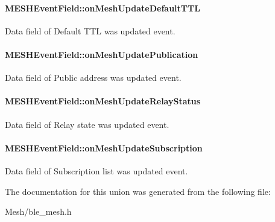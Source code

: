 \paragraph[{\texorpdfstring{on\+Mesh\+Update\+Default\+T\+TL}{onMeshUpdateDefaultTTL}}]{ M\+E\+S\+H\+Event\+Field\+::on\+Mesh\+Update\+Default\+T\+TL}\hypertarget{union_m_e_s_h_event_field_a0e704c9170129c99606ee62a60fb75d1}{}\label{union_m_e_s_h_event_field_a0e704c9170129c99606ee62a60fb75d1}
Data field of Default T\+TL was updated event. 
\paragraph[{\texorpdfstring{on\+Mesh\+Update\+Publication}{onMeshUpdatePublication}}]{ M\+E\+S\+H\+Event\+Field\+::on\+Mesh\+Update\+Publication}\hypertarget{union_m_e_s_h_event_field_a0c313b0969b5296112f23a352b7f1145}{}\label{union_m_e_s_h_event_field_a0c313b0969b5296112f23a352b7f1145}
Data field of Public address was updated event. 
\paragraph[{\texorpdfstring{on\+Mesh\+Update\+Relay\+Status}{onMeshUpdateRelayStatus}}]{ M\+E\+S\+H\+Event\+Field\+::on\+Mesh\+Update\+Relay\+Status}\hypertarget{union_m_e_s_h_event_field_af68544f8b6e88e0faba7cae025c7df4e}{}\label{union_m_e_s_h_event_field_af68544f8b6e88e0faba7cae025c7df4e}
Data field of Relay state was updated event. 
\paragraph[{\texorpdfstring{on\+Mesh\+Update\+Subscription}{onMeshUpdateSubscription}}]{ M\+E\+S\+H\+Event\+Field\+::on\+Mesh\+Update\+Subscription}\hypertarget{union_m_e_s_h_event_field_a383d8787001995c25a19f960d9928ce6}{}\label{union_m_e_s_h_event_field_a383d8787001995c25a19f960d9928ce6}
Data field of Subscription list was updated event. 

The documentation for this union was generated from the following file\+:\begin{DoxyCompactItemize}
\item 
Mesh/ble\+\_\+mesh.\+h\end{DoxyCompactItemize}
